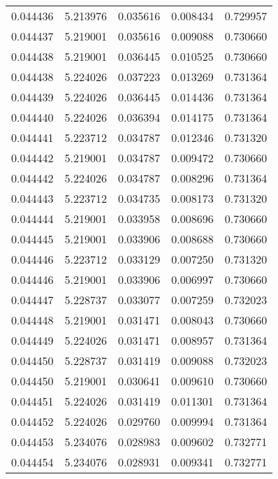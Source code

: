 \begin{tabular}{lrrrr}
0.044436    &  5.213976 &  0.035616 &  0.008434 &             0.729957 \\
0.044437    &  5.219001 &  0.035616 &  0.009088 &             0.730660 \\
0.044438    &  5.219001 &  0.036445 &  0.010525 &             0.730660 \\
0.044438    &  5.224026 &  0.037223 &  0.013269 &             0.731364 \\
0.044439    &  5.224026 &  0.036445 &  0.014436 &             0.731364 \\
0.044440    &  5.224026 &  0.036394 &  0.014175 &             0.731364 \\
0.044441    &  5.223712 &  0.034787 &  0.012346 &             0.731320 \\
0.044442    &  5.219001 &  0.034787 &  0.009472 &             0.730660 \\
0.044442    &  5.224026 &  0.034787 &  0.008296 &             0.731364 \\
0.044443    &  5.223712 &  0.034735 &  0.008173 &             0.731320 \\
0.044444    &  5.219001 &  0.033958 &  0.008696 &             0.730660 \\
0.044445    &  5.219001 &  0.033906 &  0.008688 &             0.730660 \\
0.044446    &  5.223712 &  0.033129 &  0.007250 &             0.731320 \\
0.044446    &  5.219001 &  0.033906 &  0.006997 &             0.730660 \\
0.044447    &  5.228737 &  0.033077 &  0.007259 &             0.732023 \\
0.044448    &  5.219001 &  0.031471 &  0.008043 &             0.730660 \\
0.044449    &  5.224026 &  0.031471 &  0.008957 &             0.731364 \\
0.044450    &  5.228737 &  0.031419 &  0.009088 &             0.732023 \\
0.044450    &  5.219001 &  0.030641 &  0.009610 &             0.730660 \\
0.044451    &  5.224026 &  0.031419 &  0.011301 &             0.731364 \\
0.044452    &  5.224026 &  0.029760 &  0.009994 &             0.731364 \\
0.044453    &  5.234076 &  0.028983 &  0.009602 &             0.732771 \\
0.044454    &  5.234076 &  0.028931 &  0.009341 &             0.732771 \\

\end{tabular}
